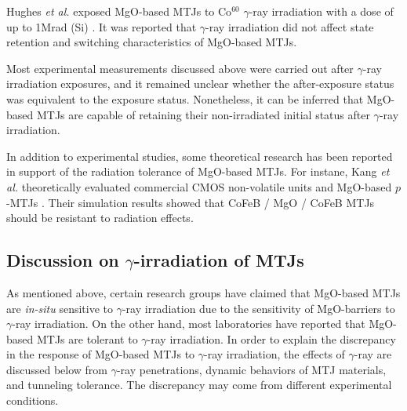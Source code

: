 \documentclass[molecules,review,submit,pdftex,moreauthors]{Definitions/mdpi}
\begin{document}


Hughes \textit{et al.} exposed MgO-based MTJs to Co$^{60}$ $\gamma$-ray irradiation with a dose of up to \unit{1}{Mrad} (Si) \cite{Hughes2012IEEE}.  It was reported that $\gamma$-ray irradiation did not affect state retention and switching characteristics of MgO-based MTJs.


Most experimental measurements discussed above were carried out after $\gamma$-ray irradiation exposures, and it remained unclear whether the after-exposure status was equivalent to the exposure status.  Nonetheless, it can be inferred that MgO-based MTJs are capable of retaining their non-irradiated initial status after $\gamma$-ray irradiation. 


In addition to experimental studies, some theoretical research has been reported in support of the radiation tolerance of MgO-based MTJs.  For instane, Kang \textit{et al.} theoretically evaluated commercial CMOS non-volatile units and MgO-based $p$-MTJs \cite{Kang2014JPd}.  Their simulation results showed that CoFeB / MgO / CoFeB MTJs should be resistant to radiation effects.  


\subsection{Discussion on $\gamma$-irradiation of MTJs}


As mentioned above, certain research groups have claimed that MgO-based MTJs are \textit{in-situ} sensitive to $\gamma$-ray irradiation due to the sensitivity of MgO-barriers to $\gamma$-ray irradiation.  On the other hand, most laboratories have reported that MgO-based MTJs are tolerant to $\gamma$-ray irradiation.  In order to explain the discrepancy in the response of MgO-based MTJs to $\gamma$-ray irradiation, the effects of $\gamma$-ray are  discussed below from $\gamma$-ray penetrations, dynamic behaviors of MTJ materials, and tunneling tolerance.  The discrepancy may come from different experimental conditions. 
\end{document}
